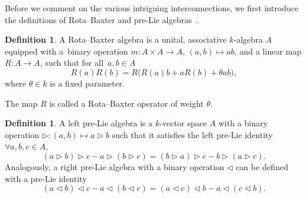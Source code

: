 \documentclass[10pt,a4paper]{amsart}
\numberwithin{equation}{section}
\theoremstyle{definition}
\newtheorem{defn}[thm]{Definition}
\def\mathcal#1{#1}%
\begin{document}
Before we comment on the various intriguing interconnections, we first introduce the definitions of Rota--Baxter and pre-Lie algebras~\cite{Rota, RBLoday, Fer, Rota2, Rota3}.
\begin{defn}%
A Rota--Baxter algebra is a unital, associative $k$-algebra $\mathcal{A}$ equipped {with a~binary operation $m\colon \mathcal{A} \times \mathcal{A} \to \mathcal{A}$, $(a,b) \mapsto a b$,} and a linear map $R\colon \mathcal{A} \to \mathcal{A}$, such that for all~${a,b \in \mathcal{A}}$
\begin{equation}
R(a) R(b) = R\bigl(R(a) b + aR(b) + \theta ab\bigr), \label{RB}
\end{equation}
where $\theta \in k$ is a fixed parameter.
\end{defn}

The map $R$ is called a Rota--Baxter operator of weight $\theta$.

\begin{defn}%
A left pre-Lie algebra is a $k$-vector space $A$ with a binary operation
$
\triangleright\colon (a,b) \mapsto a \triangleright b$ such that it satisfies the left pre-Lie identity $\forall a,b,c \in A$,
\begin{equation}
(a \triangleright b) \triangleright c- a \triangleright(b \triangleright c) = (b \triangleright a) \triangleright c- b \triangleright(a \triangleright c). \label{prelie}
\end{equation}
 Analogously, a right pre-Lie algebra with a binary operation $\triangleleft$ can be defined with a pre-Lie identity
\begin{equation*}
(a \triangleleft b) \triangleleft c- a \triangleleft (b \triangleleft c) = (a \triangleleft c) \triangleleft b- a \triangleleft(c \triangleleft b). %
\end{equation*}
\end{defn}
\end{document}
